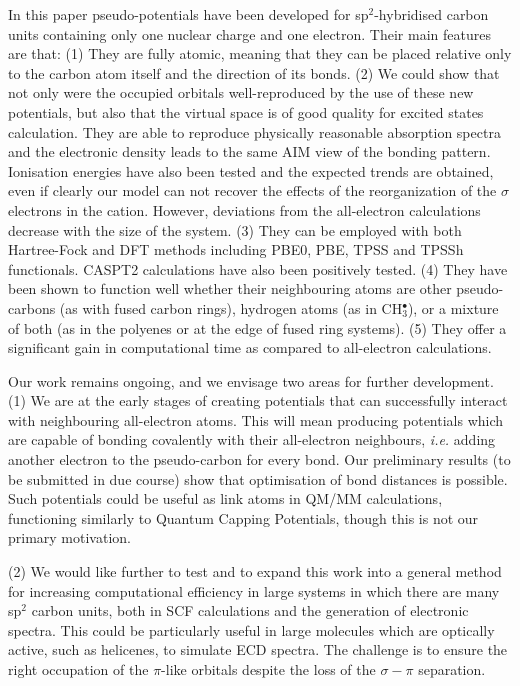 \documentclass[12pt]{article}
\begin{document}
In this paper pseudo-potentials have been developed for sp$^{2}$-hybridised carbon units containing only one nuclear charge and one electron. 
Their main features are that: 
(1) They are fully atomic, meaning that they can be placed relative only to the carbon atom itself and the direction of its bonds. 
(2) We could show that not only were the occupied orbitals well-reproduced by the use of these new potentials, but also that the virtual space is of good quality for excited states calculation. 
They are able to reproduce physically reasonable absorption spectra and the electronic
density leads to the same AIM view of the bonding pattern. Ionisation energies have
also been tested and the expected trends are obtained, even if clearly our
model can not recover the effects of the reorganization of the $\sigma$ electrons
in the cation. However, deviations
from the all-electron calculations decrease with the size of the system.
(3) They can be employed with both Hartree-Fock and DFT methods including PBE0, PBE, TPSS and TPSSh functionals. 
CASPT2 calculations have also been positively tested.
(4) They have been shown to function well whether their neighbouring atoms are other pseudo-carbons (as with fused carbon rings), hydrogen atoms (as in CH\(^{\bullet}_{3}\)),
or a mixture of both (as in the polyenes or at the edge of fused ring systems). 
(5) They offer a significant gain in computational time as compared to all-electron calculations.

Our work remains ongoing, and we envisage two areas for further development.
(1) We are at the early stages of creating potentials that can successfully interact with neighbouring all-electron atoms.
This will mean producing potentials which are capable of bonding covalently with their all-electron neighbours, \textsl{i.e.} adding another electron to the pseudo-carbon for every bond.
Our preliminary results (to be submitted in due course) show that optimisation of bond distances is possible.
Such potentials could be useful as link atoms in QM/MM calculations, functioning similarly to Quantum Capping Potentials,\cite{dilabio_simple_2002} though this is not our primary motivation.

(2) We would like further to test and to expand this work into a general method for increasing computational efficiency in large systems in
which there are many sp$^{2}$ carbon units, both in SCF calculations and the generation of electronic spectra.
This could be particularly useful in large molecules which are optically active, such as helicenes, to simulate ECD spectra.
The challenge is to ensure the right occupation of the $\pi$-like orbitals despite the loss of the
$\sigma-\pi$ separation.
\end{document}
